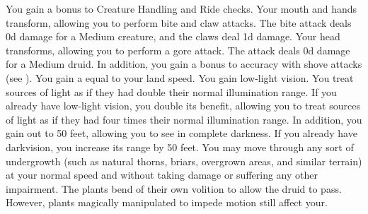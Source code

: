         You gain a  bonus to Creature Handling and Ride checks.
        Your mouth and hands transform, allowing you to perform bite and claw attacks.
        The bite attack deals \plus0d damage for a Medium creature, and the claws deal \minus1d damage.
        Your head transforms, allowing you to perform a gore attack.
        The attack deals \plus0d damage for a Medium druid.
        In addition, you gain a  bonus to accuracy with shove attacks (see ).
        You gain a  equal to your land speed.
        You gain low-light vision.
        You treat sources of light as if they had double their normal illumination range.
        If you already have low-light vision, you double its benefit, allowing you to treat sources of light as if they had four times their normal illumination range.
        In addition, you gain  out to 50 feet, allowing you to see in complete darkness.
        If you already have darkvision, you increase its range by 50 feet.
        You may move through any sort of undergrowth (such as natural thorns, briars, overgrown areas, and similar terrain) at your normal speed and without taking damage or suffering any other impairment.
        The plants bend of their own volition to allow the druid to pass.
        However, plants magically manipulated to impede motion still affect your.


